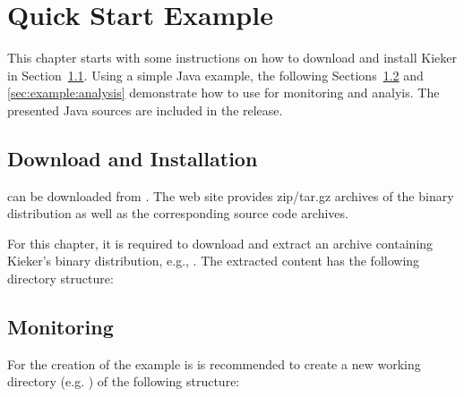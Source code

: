 \chapter{Quick Start Example}
This chapter starts with some instructions on how to download and install Kieker %
in Section~\ref{sec:example:downloadInstall}. %
Using a simple Java example, the following Sections~\ref{sec:example:monitoring} %
and \ref{sec:example:analysis} demonstrate how to use \Kieker{} for monitoring %
and analyis. %
\notify The presented Java sources are included in the \Kieker{} release.

\section{Download and Installation}\label{sec:example:downloadInstall}

\Kieker{} can be downloaded from \KiekerURL. The web %
site provides zip/tar.gz archives of the \Kieker{} binary distribution as well %
as the corresponding \Kieker{} source code archives.

For this chapter, it is required to download and extract an archive containing %
Kieker's binary distribution, e.g., .
The extracted content has the following directory structure:


\renewcommand*\DTstylecomment{\sffamily}

\vspace{1ex}


\section{Monitoring}\label{sec:example:monitoring}
For the creation of the example is is recommended to create a new working directory %
(e.g. ) of the following structure:

